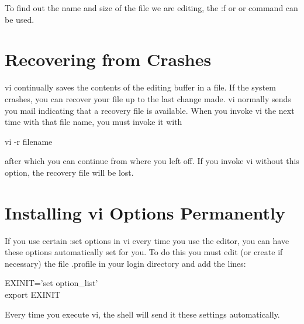      To find  out the name and size of the file we are editing, the
{\cd :f} or or   command can be used.


\section{Recovering from Crashes}
     {\cmd vi} continually saves the contents of the editing buffer in
a file. If the system crashes,  you can  recover your file up to
the last change made. {\cmd vi} normally sends you mail indicating
that a recovery file is available. When you invoke {\cmd vi} the next
time with that file name, you must invoke it with
\begin{display}\cmd
 vi -r {\ms filename\/}
\end{display}
\noindent
 after which  you can  continue from  where you left off.  If you
invoke {\cmd vi} without this option, the recovery file will be lost.


\section{Installing {\cmd vi} Options Permanently}
     If you  use certain  {\cd :set} options in {\cmd vi} every time you
use the editor, you can have these options automatically set for you.
To do this you must edit (or create if  necessary) the file {\fn .profile}
in your login directory and add the lines:
\begin{display}\cd
 EXINIT='set {\ms option\_list\/}' \\
 export EXINIT
\end{display}
\noindent
     Every time  you execute  {\cmd vi},  the  shell  will  send  it 
these  settings automatically.

